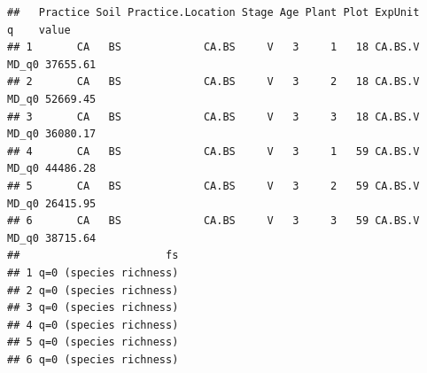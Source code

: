 \documentclass[]{interact}
\theoremstyle{plain}%
\theoremstyle{definition}
\theoremstyle{remark}
\newenvironment{Shaded}{\begin{snugshade}}{\end{snugshade}}
\newcommand{\AttributeTok}[1]{\textcolor[rgb]{0.77,0.63,0.00}{#1}}
\newcommand{\ConstantTok}[1]{\textcolor[rgb]{0.00,0.00,0.00}{#1}}
\newcommand{\FunctionTok}[1]{\textcolor[rgb]{0.00,0.00,0.00}{#1}}
\newcommand{\NormalTok}[1]{#1}
\newcommand{\OtherTok}[1]{\textcolor[rgb]{0.56,0.35,0.01}{#1}}
\newcommand{\SpecialCharTok}[1]{\textcolor[rgb]{0.00,0.00,0.00}{#1}}
\newcommand{\StringTok}[1]{\textcolor[rgb]{0.31,0.60,0.02}{#1}}
\begin{document}
\begin{Shaded}
\end{Shaded}

\begin{verbatim}
##   Practice Soil Practice.Location Stage Age Plant Plot ExpUnit     q    value
## 1       CA   BS             CA.BS     V   3     1   18 CA.BS.V MD_q0 37655.61
## 2       CA   BS             CA.BS     V   3     2   18 CA.BS.V MD_q0 52669.45
## 3       CA   BS             CA.BS     V   3     3   18 CA.BS.V MD_q0 36080.17
## 4       CA   BS             CA.BS     V   3     1   59 CA.BS.V MD_q0 44486.28
## 5       CA   BS             CA.BS     V   3     2   59 CA.BS.V MD_q0 26415.95
## 6       CA   BS             CA.BS     V   3     3   59 CA.BS.V MD_q0 38715.64
##                       fs
## 1 q=0 (species richness)
## 2 q=0 (species richness)
## 3 q=0 (species richness)
## 4 q=0 (species richness)
## 5 q=0 (species richness)
## 6 q=0 (species richness)
\end{verbatim}
\end{document}
